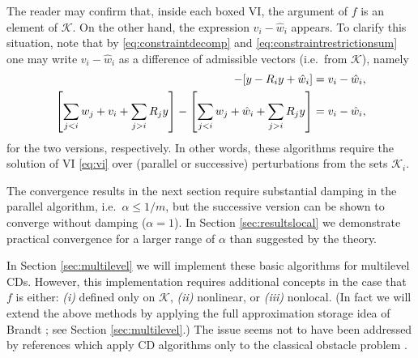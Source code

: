 \documentclass[letterpaper,final,12pt,reqno]{amsart}
\theoremstyle{cstyle}
\theoremstyle{dstyle}
\numberwithin{equation}{section}
\numberwithin{figure}{section}
\numberwithin{table}{section}
\numberwithin{theorem}{section}
\newcommand{\cK}{\mathcal{K}}
\begin{document}
The reader may confirm that, inside each boxed VI, the argument of $f$ is an element of $\cK$.  On the other hand, the expression $v_i - \hat w_i$ appears.  To clarify this situation, note that by \eqref{eq:constraintdecomp} and \eqref{eq:constraintrestrictionsum} one may write $v_i - \hat w_i$ as a difference of admissible vectors (i.e.~from $\cK$), namely
\begin{align*}
[y - R_i y + v_i] - [y - R_i y + \hat w_i] &= v_i - \hat w_i, \label{eq:admissibledifference} \\
\left[\sum_{j<i} w_j + v_i + \sum_{j>i} R_j y\right] - \left[\sum_{j<i} w_j + \hat w_i + \sum_{j>i} R_j y\right] &= v_i - \hat w_i,  \notag
\end{align*}
for the two versions, respectively.  In other words, these algorithms require the solution of VI \eqref{eq:vi} over (parallel or successive) perturbations from the sets $\cK_i$.

The convergence results in the next section require substantial damping in the parallel algorithm, i.e.~$\alpha \le 1/m$, but the successive version can be shown to converge without damping ($\alpha=1$).  In Section \ref{sec:resultslocal} we demonstrate practical convergence for a larger range of $\alpha$ than suggested by the theory.  %

In Section \ref{sec:multilevel} we will implement these basic algorithms for multilevel CDs.  However, this implementation requires additional concepts in the case that $f$ is either: \emph{(i)} defined only on $\cK$, \emph{(ii)} nonlinear, or \emph{(iii)} nonlocal.  (In fact we will extend the above methods by applying the full approximation storage idea of Brandt \cite{Brandt1977}; see Section \ref{sec:multilevel}.)  The issue seems not to have been addressed by references which apply CD algorithms only to the classical obstacle problem \cite[in particular]{GraeserKornhuber2009,Tai2003}.
\end{document}
